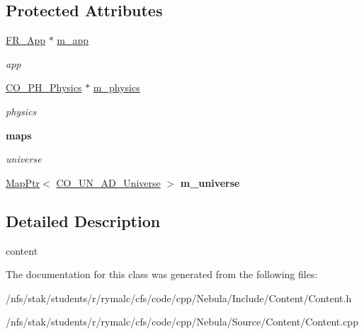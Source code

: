 \subsection*{Protected Attributes}
\begin{DoxyCompactItemize}
\item 
\hypertarget{classContent_1_1Content_aba1a137bbc2664877b040922f15d7668}{
\hyperlink{classFramework_1_1App}{FR\_\-App} $\ast$ \hyperlink{classContent_1_1Content_aba1a137bbc2664877b040922f15d7668}{m\_\-app}}
\label{classContent_1_1Content_aba1a137bbc2664877b040922f15d7668}

\begin{DoxyCompactList}\small\item\em app \item\end{DoxyCompactList}\item 
\hypertarget{classContent_1_1Content_afe3339e6bc4847b68df69f73ddab0aad}{
\hyperlink{classContent_1_1Physics_1_1Physics}{CO\_\-PH\_\-Physics} $\ast$ \hyperlink{classContent_1_1Content_afe3339e6bc4847b68df69f73ddab0aad}{m\_\-physics}}
\label{classContent_1_1Content_afe3339e6bc4847b68df69f73ddab0aad}

\begin{DoxyCompactList}\small\item\em physics \item\end{DoxyCompactList}\end{DoxyCompactItemize}
\begin{Indent}{\bf maps}\par
{\em \label{_amgrp7e94476d62556cc8501e3df5b8d6470d}
 universe }\begin{DoxyCompactItemize}
\item 
\hypertarget{classContent_1_1Content_af2ee48fcd41513323c18915e55a904bc}{
\hyperlink{classMapPtr}{MapPtr}$<$ \hyperlink{classContent_1_1Universe_1_1Admin_1_1Universe}{CO\_\-UN\_\-AD\_\-Universe} $>$ {\bfseries m\_\-universe}}
\label{classContent_1_1Content_af2ee48fcd41513323c18915e55a904bc}

\end{DoxyCompactItemize}
\end{Indent}


\subsection{Detailed Description}
content 

The documentation for this class was generated from the following files:\begin{DoxyCompactItemize}
\item 
/nfs/stak/students/r/rymalc/cfs/code/cpp/Nebula/Include/Content/Content.h\item 
/nfs/stak/students/r/rymalc/cfs/code/cpp/Nebula/Source/Content/Content.cpp\end{DoxyCompactItemize}

